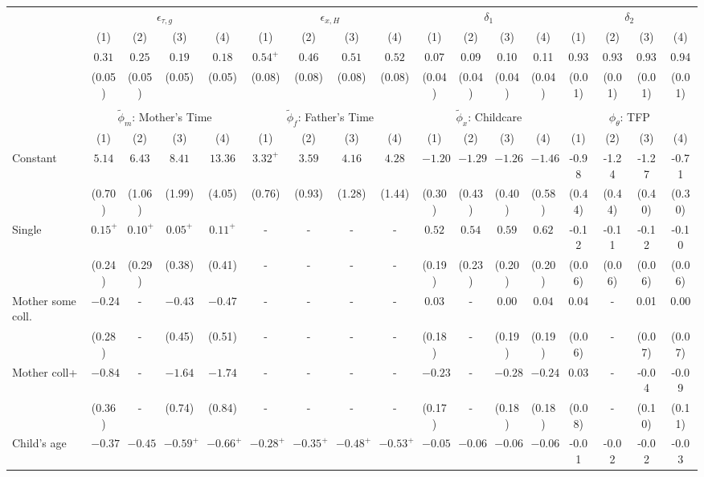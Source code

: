 \begin{tabular}{lcccccccccccccccc}\\\toprule
 & \multicolumn{4}{c}{$\epsilon_{\tau,g}$} & \multicolumn{4}{c}{$\epsilon_{x,H}$} & \multicolumn{4}{c}{$\delta_{1}$} & \multicolumn{4}{c}{$\delta_{2}$} \\
&(1)&(2)&(3)&(4)&(1)&(2)&(3)&(4)&(1)&(2)&(3)&(4)&(1)&(2)&(3)&(4)\\\cmidrule(r){2-5}\cmidrule(r){6-9}\cmidrule(r){10-13}\cmidrule(r){14-17}
&$0.31$&$0.25$&$0.19$&$0.18$&$0.54^{+}$&$0.46$&$0.51$&$0.52$&0.07&0.09&0.10&0.11&0.93&0.93&0.93&0.94\\
&(0.05)&(0.05)&(0.05)&(0.05)&(0.08)&(0.08)&(0.08)&(0.08)&(0.04)&(0.04)&(0.04)&(0.04)&(0.01)&(0.01)&(0.01)&(0.01)\\
&&&&&&&&&&&&&&&&\\
 & \multicolumn{4}{c}{$\tilde{\phi}_{m}$: Mother's Time} & \multicolumn{4}{c}{$\tilde{\phi}_{f}$: Father's Time} & \multicolumn{4}{c}{$\tilde{\phi}_{x}$: Childcare} & \multicolumn{4}{c}{$\phi_{\theta}$: TFP} \\
&(1)&(2)&(3)&(4)&(1)&(2)&(3)&(4)&(1)&(2)&(3)&(4)&(1)&(2)&(3)&(4)\\\cmidrule(r){2-5}\cmidrule(r){6-9}\cmidrule(r){10-13}\cmidrule(r){14-17}
Constant&$5.14$&$6.43$&$8.41$&$13.36$&$3.32^{+}$&$3.59$&$4.16$&$4.28$&$-1.20$&$-1.29$&$-1.26$&$-1.46$&-0.98&-1.24&-1.27&-0.71\\
&(0.70)&(1.06)&(1.99)&(4.05)&(0.76)&(0.93)&(1.28)&(1.44)&(0.30)&(0.43)&(0.40)&(0.58)&(0.44)&(0.44)&(0.40)&(0.30)\\
Single&$0.15^{+}$&$0.10^{+}$&$0.05^{+}$&$0.11^{+}$&-&-&-&-&$0.52$&$0.54$&$0.59$&$0.62$&-0.12&-0.11&-0.12&-0.10\\
&(0.24)&(0.29)&(0.38)&(0.41)&-&-&-&-&(0.19)&(0.23)&(0.20)&(0.20)&(0.06)&(0.06)&(0.06)&(0.06)\\
Mother some coll.&$-0.24$&-&$-0.43$&$-0.47$&-&-&-&-&$0.03$&-&$0.00$&$0.04$&0.04&-&0.01&0.00\\
&(0.28)&-&(0.45)&(0.51)&-&-&-&-&(0.18)&-&(0.19)&(0.19)&(0.06)&-&(0.07)&(0.07)\\
Mother coll+&$-0.84$&-&$-1.64$&$-1.74$&-&-&-&-&$-0.23$&-&$-0.28$&$-0.24$&0.03&-&-0.04&-0.09\\
&(0.36)&-&(0.74)&(0.84)&-&-&-&-&(0.17)&-&(0.18)&(0.18)&(0.08)&-&(0.10)&(0.11)\\
Child's age&$-0.37$&$-0.45$&$-0.59^{+}$&$-0.66^{+}$&$-0.28^{+}$&$-0.35^{+}$&$-0.48^{+}$&$-0.53^{+}$&$-0.05$&$-0.06$&$-0.06$&$-0.06$&-0.01&-0.02&-0.02&-0.03\\

\end{tabular}

